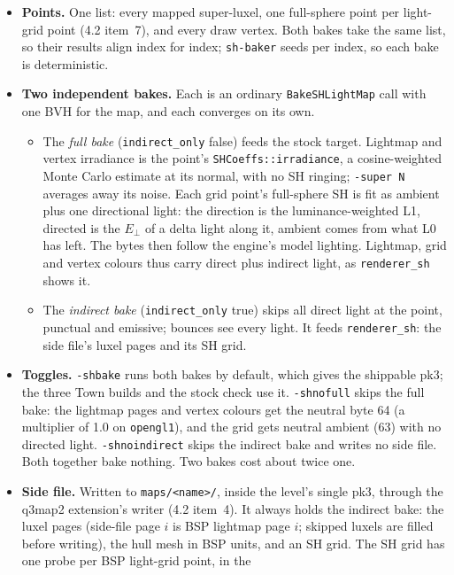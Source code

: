 \documentclass[11pt,a4paper]{article}
\begin{document}
\begin{itemize}
  props, foliage) stay thin. The un-shrunk hulls go into the side file for 3.5.
\item \textbf{Points.} One list: every mapped super-luxel, one full-sphere point per light-grid
  point (4.2 item~7), and every draw vertex. Both bakes take the same list, so their results align
  index for index; \texttt{sh-baker} seeds per index, so each bake is deterministic.
\item \textbf{Two independent bakes.} Each is an ordinary \texttt{BakeSHLightMap} call with one BVH
  for the map, and each converges on its own.
  \begin{itemize}
  \item The \emph{full bake} (\texttt{indirect\_only} false) feeds the stock target. Lightmap and
    vertex irradiance is the point's \texttt{SHCoeffs::irradiance}, a cosine-weighted Monte Carlo
    estimate at its normal, with no SH ringing; \texttt{-super N} averages away its noise. Each
    grid point's full-sphere SH is fit as ambient plus one directional light: the direction is the
    luminance-weighted L1, directed is the $E_\perp$ of a delta light along it, ambient comes from
    what L0 has left. The bytes then follow the engine's model lighting. Lightmap, grid and vertex
    colours thus carry direct plus indirect light, as \texttt{renderer\_sh} shows it.
  \item The \emph{indirect bake} (\texttt{indirect\_only} true) skips all direct light at the
    point, punctual and emissive; bounces see every light. It feeds \texttt{renderer\_sh}: the side
    file's luxel pages and its SH grid.
  \end{itemize}
\item \textbf{Toggles.} \texttt{-shbake} runs both bakes by default, which gives the shippable pk3;
  the three Town builds and the stock check use it. \texttt{-shnofull} skips the full bake: the lightmap
  pages and vertex colours get the neutral byte 64 (a multiplier of 1.0 on \texttt{opengl1}), and
  the grid gets neutral ambient (63) with no directed light. \texttt{-shnoindirect} skips the indirect
  bake and writes no side file. Both together bake nothing. Two bakes cost about twice one.
\item \textbf{Side file.} Written to \texttt{maps/<name>/}, inside the level's single pk3, through
  the q3map2 extension's writer (4.2 item~4). It always holds the indirect bake: the luxel pages
  (side-file page $i$ is BSP lightmap page $i$; skipped luxels are filled before writing), the hull
  mesh in BSP units, and an SH grid. The SH grid has one probe per BSP light-grid point, in the

\end{itemize}
\end{document}
